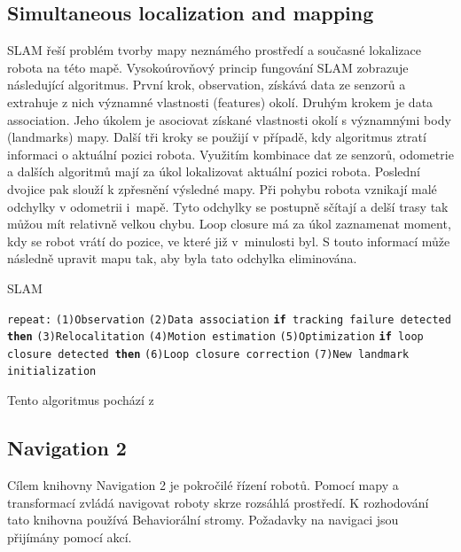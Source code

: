 \subsection*{Simultaneous localization and mapping}
SLAM řeší problém tvorby mapy neznámého prostředí a současné lokalizace robota na této mapě. Vysokoúrovňový princip fungování SLAM zobrazuje následující algoritmus. První krok, observation, získává data ze senzorů a extrahuje z nich významné vlastnosti (features) okolí. Druhým krokem je data association. Jeho úkolem je asociovat získané vlastnosti okolí s významnými body (landmarks) mapy. Další tři kroky se použijí v případě, kdy algoritmus ztratí informaci o aktuální pozici robota. Využitím kombinace dat ze senzorů, odometrie a dalších algoritmů mají za úkol lokalizovat aktuální pozici robota. Poslední dvojice pak slouží k zpřesnění výsledné mapy. Při pohybu robota vznikají malé odchylky v odometrii i~mapě. Tyto odchylky se postupně sčítají a delší trasy tak můžou mít relativně velkou chybu. Loop closure má za úkol zaznamenat moment, kdy se robot vrátí do pozice, ve které již v~minulosti byl. S touto informací může následně upravit mapu tak, aby byla tato odchylka eliminována. \cite[str:~414-418]{slam}

\newpage
\begin{algorithm}[h!]
	\label{}
	\caption{\textsc{SLAM}}
	
	\DontPrintSemicolon
	\SetAlgoNoLine
	\SetNlSty{}{}{:}
	\SetNlSkip{-1.1em}
	
	\BlankLine \Indp\Indpp
	
	\texttt{repeat:}\;
	\Indp\Indp
	\texttt{(1)Observation}\;	
	\texttt{(2)Data association}\;
	\texttt{\textbf{if} tracking failure detected \textbf{then}}\;
	\Indp\Indp
	\texttt{(3)Relocalitation}\;
	\texttt{(4)Motion estimation}\;
	\texttt{(5)Optimization}\;
	\Indm\Indm
	\texttt{\textbf{if} loop closure detected \textbf{then}}\;
	\Indp\Indp
	\texttt{(6)Loop closure correction}\;
	\texttt{(7)New landmark initialization}\;
	
\end{algorithm}
\begin{center}
	\vspace{-2em}
	Tento algoritmus pochází z \cite[str:~414]{slam}
\end{center}

\subsection*{Navigation 2} \label{theory:nav2}
Cílem knihovny Navigation 2 je pokročilé řízení robotů. Pomocí mapy a transformací zvládá navigovat roboty skrze rozsáhlá prostředí. K rozhodování tato knihovna používá Behaviorální stromy. Požadavky na navigaci jsou přijímány pomocí akcí. \cite{nav2_documentation}

